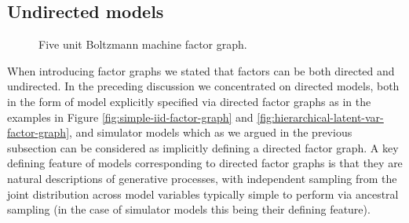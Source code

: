 
 
\subsection{Undirected models}

\begin{figure}[!t]
\vskip 0pt
\centering
{}
\caption[Boltzmann machine factor graph.]{Five unit Boltzmann machine factor graph.}
\label{fig:boltzmann-machine-factor-graph}
\end{figure}

When introducing factor graphs we stated that factors can be both directed and undirected. In the preceding discussion we concentrated on directed models, both in the form of model explicitly specified via directed factor graphs as in the examples in Figure \ref{fig:simple-iid-factor-graph} and \ref{fig:hierarchical-latent-var-factor-graph}, and simulator models which as we argued in the previous subsection can be considered as implicitly defining a directed factor graph. A key defining feature of models corresponding to directed factor graphs is that they are natural descriptions of generative processes, with independent sampling from the joint distribution across model variables typically simple to perform via ancestral sampling (in the case of simulator models this being their defining feature).

